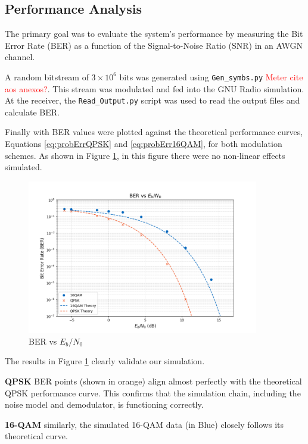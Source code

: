 \subsection{Performance Analysis}

The primary goal was to evaluate the system's performance by measuring the Bit Error Rate (BER) as a function of the Signal-to-Noise Ratio (SNR) in an AWGN channel.

A random bitstream of $3 \times 10^6$ bits was generated using \texttt{Gen\_symbs.py} \textcolor{red}{Meter cite aos anexos?}. This stream was modulated and fed into the GNU Radio simulation. At the receiver, the \texttt{Read\_Output.py} script was used to read the output files and calculate BER.

Finally with BER values were plotted against the theoretical performance curves, Equations \ref{eq:probErrQPSK} and \ref{eq:probErr16QAM}, for both modulation schemes. As shown in Figure \ref{fig:BER_SNR_a3_0}, in this figure there were no non-linear effects simulated.

\begin{figure}[H]
    \centering
    \includegraphics*[width=0.9\textwidth]{Images/BER_SNR_a3_0.png}
    \caption{BER vs $E_b/N_0$}
    \label{fig:BER_SNR_a3_0}
\end{figure}

The results in Figure \ref{fig:BER_SNR_a3_0} clearly validate our simulation.

\textbf{QPSK} BER points (shown in orange) align almost perfectly with the theoretical QPSK performance curve. This confirms that the simulation chain, including the noise model and demodulator, is functioning correctly.

\textbf{16-QAM} similarly, the simulated 16-QAM data (in Blue) closely follows its theoretical curve.


